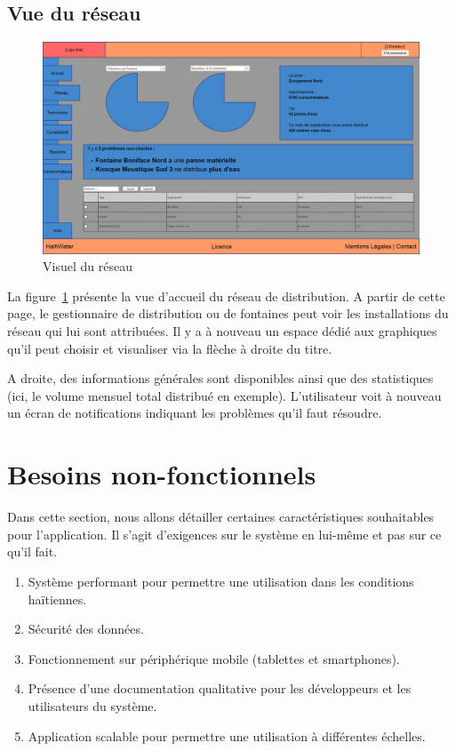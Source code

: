 \documentclass[a4paper, 11pt]{article}
\begin{document}
  \subsection{Vue du réseau}
    \begin{figure}[H]
        \includegraphics[width=\textwidth]{Cahier_des_Charges/reseau}
        \caption{Visuel du réseau}
        \label{fig:network}
    \end{figure}
    La figure~\ref{fig:network} présente la vue d'accueil du réseau de distribution. A partir de cette page, le gestionnaire de distribution ou de fontaines peut voir les installations du réseau qui lui sont attribuées. Il y a à nouveau un espace dédié aux graphiques qu'il peut choisir et visualiser via la flèche à droite du titre.

    A droite, des informations générales sont disponibles ainsi que des statistiques (ici, le volume mensuel total distribué en exemple).
    L'utilisateur voit à nouveau un écran de notifications indiquant les problèmes qu'il faut résoudre.

\section{Besoins non-fonctionnels}
Dans cette section, nous allons détailler certaines caractéristiques souhaitables pour l'application. Il s'agit d'exigences sur le système en lui-même et pas sur ce qu'il fait.
\begin{enumerate}
  \item Système performant pour permettre une utilisation dans les conditions haïtiennes.
  \item Sécurité des données.
  \item Fonctionnement sur périphérique mobile (tablettes et smartphones).
  \item Présence d'une documentation qualitative pour les développeurs et les utilisateurs du système.
  \item Application scalable pour permettre une utilisation à différentes échelles.
\end{enumerate}
\end{document}
